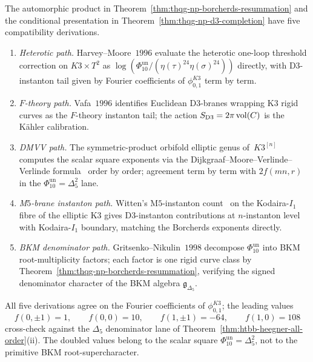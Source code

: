 \begin{remark}
\label{rem:thqg-np-multipath}
The automorphic product in Theorem~\ref{thm:thqg-np-borcherds-resummation}
and the conditional presentation in
Theorem~\ref{thm:thqg-np-d3-completion} have five compatibility
derivations.
\begin{enumerate}[leftmargin=1.8em,label=\textup{(\alph*)}]
\item \emph{Heterotic path.} Harvey--Moore~$1996$
\cite[\S 4]{HarveyMoore1996} evaluate the heterotic one-loop
threshold correction on $K3\times T^2$ as
\(\log(\Phi_{10}^{\mathrm{un}}/(\eta(\tau)^{24}\eta(\sigma)^{24}))\)
directly, with D$3$-instanton tail given by Fourier coefficients of
$\phi_{0,1}^{K3}$ term by term.
\item \emph{$F$-theory path.} Vafa~$1996$
\cite[\S 2]{Vafa1996F} identifies Euclidean D$3$-branes wrapping
K$3$ rigid curves as the $F$-theory instanton tail; the action
$S_{\mathrm{D3}} = 2\pi\operatorname{vol}(C)$ is the K\"ahler calibration.
\item \emph{DMVV path.} The symmetric-product orbifold elliptic genus
of~$K3^{[n]}$ computes the scalar square exponents via the
Dijkgraaf--Moore--Verlinde--Verlinde
formula~\cite{DMVV1997} order by order; agreement term by term with
$2f(mn,r)$ in the $\Phi_{10}^{\mathrm{un}}=\Delta_5^2$ lane.
\item \emph{M$5$-brane instanton path.} Witten's M$5$-instanton
count~\cite[\S 5]{Witten1996M5} on the Kodaira-$I_1$ fibre of the
elliptic K$3$ gives D$3$-instanton contributions at $n$-instanton
level with Kodaira-$I_1$ boundary, matching the Borcherds exponents
directly.
\item \emph{BKM denominator path.} Gritsenko--Nikulin~$1998$
\cite[Thm.~2.1]{GritsenkoNikulin1998} decompose $\Phi_{10}^{\mathrm{un}}$ into BKM
root-multiplicity factors; each factor is one rigid curve class by
Theorem~\ref{thm:thqg-np-borcherds-resummation}, verifying the
signed denominator character of the BKM algebra $\mathfrak{g}_{\Delta_5}$.
\end{enumerate}
All five derivations agree on the Fourier coefficients of $\phi_{0,1}^{K3}$; the
leading values
\[
 f(0,\pm1)=1,\qquad f(0,0)=10,\qquad
 f(1,\pm1)=-64,\qquad f(1,0)=108
\]
cross-check against the $\Delta_5$ denominator lane of
Theorem~\ref{thm:htbb-heegner-all-order}(ii).  The doubled values
belong to the scalar square
$\Phi_{10}^{\mathrm{un}}=\Delta_5^2$, not to the primitive
BKM root-supercharacter.
\end{remark}

